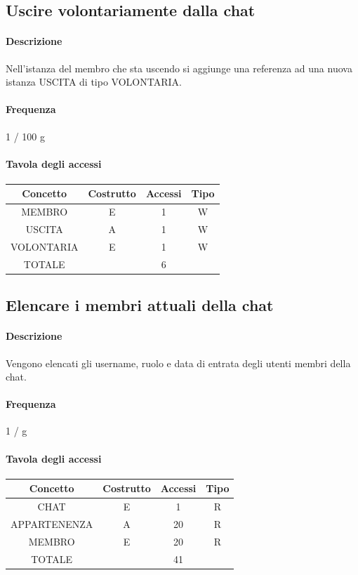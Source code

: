 \documentclass[a4paper,12pt]{report}
\begin{document}
\subsection{Uscire volontariamente dalla chat} \label{uscire_volontariamente}
\paragraph{Descrizione} Nell'istanza del membro che sta uscendo si aggiunge una referenza ad una nuova istanza USCITA di tipo VOLONTARIA.
\paragraph{Frequenza} 1 / 100 g 
\begin{table}[H]
\paragraph{Tavola degli accessi\newline}
\begin{tabular}{|c|c|c|c|}
\hline
Concetto   & Costrutto & Accessi & Tipo \\ \hline
MEMBRO     & E         & 1       & W    \\ \hline
USCITA     & A         & 1       & W    \\ \hline
VOLONTARIA & E         & 1       & W    \\ \hline
TOTALE     &           & 6       &      \\ \hline
\end{tabular}
\end{table}
\subsection{Elencare i membri attuali della chat} \label{membri_chat}
\paragraph{Descrizione} Vengono elencati gli username, ruolo e data di entrata degli utenti membri della chat.
\paragraph{Frequenza} 1 / g
\begin{table}[H]
\paragraph{Tavola degli accessi\newline}
\begin{tabular}{|c|c|c|c|}
\hline
Concetto     & Costrutto & Accessi & Tipo \\ \hline
CHAT         & E         & 1       & R    \\ \hline
APPARTENENZA & A         & 20      & R    \\ \hline
MEMBRO       & E         & 20      & R    \\ \hline
TOTALE       &           & 41      &      \\ \hline
\end{tabular}
\end{table}
\end{document}
